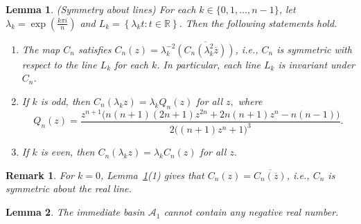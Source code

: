 \documentclass[10pt,a4paper]{amsart}
\newtheorem{lem}{Lemma}
\newtheorem{rem}{Remark}
\begin{document}
\begin{lem}(Symmetry about  lines) \label{Inv_lines_ref-sym}
	For each $k \in \{ 0, 1, \dots, n-1\}$, let $\lambda_{k} = \exp\left(\frac{k\pi i}{n}\right)$ and  $L_{k} = \left\{ \lambda_k t : t \in \mathbb{R}\right\}$. Then the following statements hold.
	\begin{enumerate}
		\item The map $C_{n}$ satisfies $C_n (z)=\lambda_k ^{-2} \overline{(C_n (\lambda_k ^2 \overline{z}))}$, i.e., $C_n$ is symmetric with respect to the line $L_k$ for each $k$. In particular, each line $L_k$ is invariant under $C_{n}$. 
		\item If  $k$ is odd, then 
	$C_{n}(\lambda_{k} z) = \lambda_{k} Q_n (z)$ for all $z,$  where 
	\begin{equation}
		Q_n(z)= \frac{z^{n+1} \big(n(n+1)(2n+1)z^{2n} + 2n(n+1)z^{n} - n(n-1)\big)}{2\big((n+1)z^{n} + 1\big)^3}.
		\label{Q_conj} 
	\end{equation} 
		\item 	If $k$ is even, then 
		$C_{n}(\lambda_{k} z) = \lambda_{k} C_{n}(z)$ for all $z.$ 
	
	\end{enumerate}  
\end{lem}

\begin{rem}
	For $k=0$, Lemma~\ref{Inv_lines_ref-sym}(1) gives that 
	$C_n (z)=\overline{C_n(\overline{z})}$, i.e., $C_n$ is symmetric about the real line.
	\label{symm-R}
\end{rem}

	\begin{lem}\label{Non-A_1}
	The immediate basin	$\mathcal{A}_1$ cannot contain any negative real number.
	\end{lem}	
\end{document}
